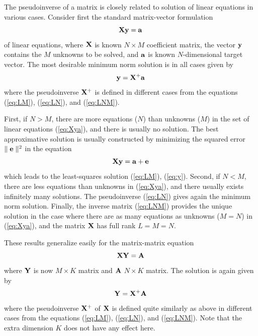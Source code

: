 \begin{enumerate}
\begin{solution}
    The pseudoinverse of a matrix is closely related to solution of linear equations in 
    various cases. Consider first the standard matrix-vector formulation 
    \begin{equation}
      {\bf X}{\bf y} = {\bf a}
      \label{eq:Xya}
    \end{equation}
    of linear equations, where ${\bf X}$ is known $N \times M$ coefficient matrix,
    the vector ${\bf y}$ contains the $M$ unknowns to be solved, and ${\bf a}$ is
    known $N$-dimensional target vector. The most desirable minimum norm solution is in
    all cases given by
    \begin{equation}
      {\bf y} = {\bf X}^+{\bf a}
      \label{eq:y}
    \end{equation}
    where the pseudoinverse ${\bf X}^+$ is defined in different cases from the equations
    (\ref{eq:LM}), (\ref{eq:LN}), and (\ref{eq:LNM}). 

    First, if $N > M$, there are more equations ($N$) than unknowns ($M$) in the set
    of linear equations (\ref{eq:Xya}), and there is usually no solution. The best
    approximative solution is usually constructed by minimizing the squared error
    $\parallel {\bf e} \parallel^2$ in the equation
    \begin{equation}
      {\bf X}{\bf y} = {\bf a} + {\bf e}
      \label{eq:lseq}
    \end{equation}
    which leads to the least-squares solution (\ref{eq:LM}), (\ref{eq:y}). Second,
    if $N <M$, there are less equations than unknowns in (\ref{eq:Xya}), and there
    usually exists infinitely many solutions. The pseudoinverse (\ref{eq:LN}) gives
    again the minimum norm solution. Finally, the inverse matrix (\ref{eq:LNM})
    provides the unique solution in the case where there are as many equations as
    unknowns ($M=N$) in (\ref{eq:Xya}), and the matrix ${\bf X}$ has full rank
    $L = M = N$.

    These results generalize easily for the matrix-matrix equation
    \begin{equation}
      {\bf XY} = {\bf A}
      \label{eq:XYA}
    \end{equation}
    where ${\bf Y}$ is now $M \times K$ matrix and ${\bf A}$ $N \times K$ matrix. The
    solution is again given by 
    \begin{equation}
      {\bf Y} = {\bf X}^+{\bf A}
      \label{eq:Y}
    \end{equation}
    where the pseudoinverse ${\bf X}^+$ of ${\bf X}$ is defined quite similarly as above in 
    different cases from the equations (\ref{eq:LM}), (\ref{eq:LN}), and (\ref{eq:LNM}).
    Note that the extra dimension $K$ does not have any effect here.


\end{solution}
\end{enumerate}
